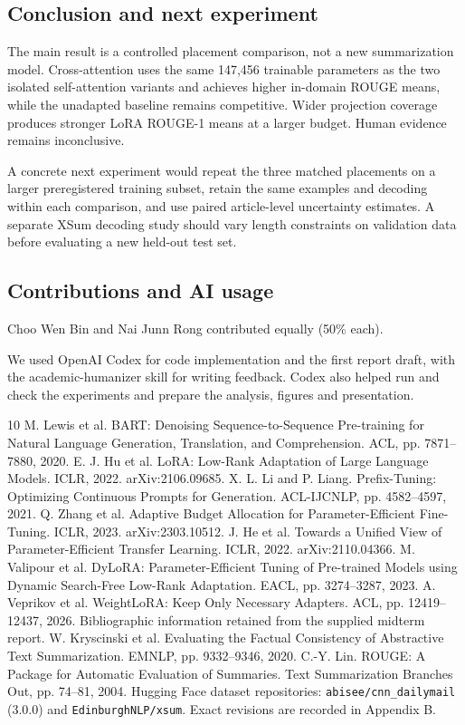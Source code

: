 \documentclass[11pt,letterpaper]{article}
\begin{document}
\subsection{Conclusion and next experiment}
The main result is a controlled placement comparison, not a new summarization model. Cross-attention uses the same 147,456 trainable parameters as the two isolated self-attention variants and achieves higher in-domain ROUGE means, while the unadapted baseline remains competitive. Wider projection coverage produces stronger LoRA ROUGE-1 means at a larger budget. Human evidence remains inconclusive.

A concrete next experiment would repeat the three matched placements on a larger preregistered training subset, retain the same examples and decoding within each comparison, and use paired article-level uncertainty estimates. A separate XSum decoding study should vary length constraints on validation data before evaluating a new held-out test set.
\subsection{Contributions and AI usage}
Choo Wen Bin and Nai Junn Rong contributed equally (50\% each).

We used OpenAI Codex for code implementation and the first report draft, with the academic-humanizer skill for writing feedback. Codex also helped run and check the experiments and prepare the analysis, figures and presentation.

\clearpage
\begin{thebibliography}{10}
 M. Lewis et al. BART: Denoising Sequence-to-Sequence Pre-training for Natural Language Generation, Translation, and Comprehension. ACL, pp. 7871--7880, 2020.
 E. J. Hu et al. LoRA: Low-Rank Adaptation of Large Language Models. ICLR, 2022. arXiv:2106.09685.
 X. L. Li and P. Liang. Prefix-Tuning: Optimizing Continuous Prompts for Generation. ACL-IJCNLP, pp. 4582--4597, 2021.
 Q. Zhang et al. Adaptive Budget Allocation for Parameter-Efficient Fine-Tuning. ICLR, 2023. arXiv:2303.10512.
 J. He et al. Towards a Unified View of Parameter-Efficient Transfer Learning. ICLR, 2022. arXiv:2110.04366.
 M. Valipour et al. DyLoRA: Parameter-Efficient Tuning of Pre-trained Models using Dynamic Search-Free Low-Rank Adaptation. EACL, pp. 3274--3287, 2023.
 A. Veprikov et al. WeightLoRA: Keep Only Necessary Adapters. ACL, pp. 12419--12437, 2026. Bibliographic information retained from the supplied midterm report.
 W. Kryscinski et al. Evaluating the Factual Consistency of Abstractive Text Summarization. EMNLP, pp. 9332--9346, 2020.
 C.-Y. Lin. ROUGE: A Package for Automatic Evaluation of Summaries. Text Summarization Branches Out, pp. 74--81, 2004.
 Hugging Face dataset repositories: \texttt{abisee/cnn\_dailymail} (3.0.0) and \texttt{EdinburghNLP/xsum}. Exact revisions are recorded in Appendix B.
\end{thebibliography}
\appendix
\end{document}

